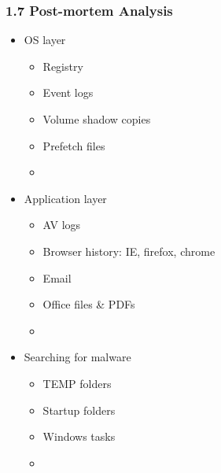 \begin{frame}
  \frametitle{1.7 Post-mortem Analysis}
  \begin{itemize}
      \item OS layer
        \begin{itemize}
            \item[] Registry
            \item[] Event logs
            \item[] Volume shadow copies
            \item[] Prefetch files
            \item[]
        \end{itemize}
      \item Application layer
        \begin{itemize}
            \item[] AV logs
            \item[] Browser history: IE, firefox, chrome
            \item[] Email
            \item[] Office files \& PDFs
            \item[]
        \end{itemize}
      \item Searching for malware
        \begin{itemize}
            \item[] TEMP folders
            \item[] Startup folders
            \item[] Windows tasks
            \item[]
        \end{itemize}
  \end{itemize}
\end{frame}


